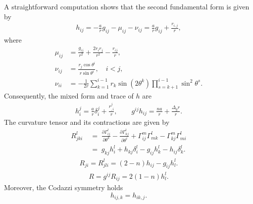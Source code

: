 \documentclass[reqno,11pt, letterpaper]{amsart}
\theoremstyle{plain}
\theoremstyle{definition}
\numberwithin{equation}{section}
\begin{document}
     A straightforward computation shows that the second fundamental form is given by
     \begin{align*}
	h_{ij}=-\frac{a}{r}g_{ij}-\mu_{ij}-\nu_{ij}=\frac{a}{r}g_{ij}+\frac{r_{i,j}}{r},
\end{align*}
     where
     \begin{align*}
     	\mu_{ij} &= \frac{g_{ij}}{r^2} + \frac{2 r_i r_j}{r^2} - \frac{r_{ij}}{r},\\
     	\nu_{ij} &= \frac{r_j \cos\theta^i}{r \sin\theta^i}, \quad i<j,\\
     	\nu_{ii} &= -\frac{1}{2r} \sum_{k=1}^{i-1} r_k \sin(2\theta^k) \prod_{s=k+1}^{i-1} \sin^2\theta^s.
     \end{align*}  
     Consequently, the mixed form and trace of $h$ are
     \begin{align}\label{kappa}
     	h_i^j = \frac{a}{r} \delta_i^j + \frac{r^j_{,i}}{r}, \qquad g^{ij} h_{ij} = \frac{n a}{r} + \frac{\Delta_g r}{r}.
     \end{align}
     The curvature tensor and its contractions are given by
          \begin{align*}
     	R^l_{jki}&\;=\;\frac{\partial\Gamma^l_{ij}}{\partial\theta^k}-\frac{\partial\Gamma^l_{kj}}{\partial\theta^i}+\Gamma^m_{ij}\Gamma^l_{mk}-\Gamma^m_{kj}\Gamma^l_{mi}\\
     	&\;=\;g_{kj}h^l_i+h_{kj}\delta^l_i-g_{ij}h^l_k-h_{ij}\delta^l_k.
     \end{align*}
     \begin{align*}
     	R_{ji}=R^{l}_{jli}=\left(2-n\right)h_{ij}-g_{ij}h^l_l.
     \end{align*}
     \begin{align*}
     	R=g^{ij}R_{ij}=2(1-n)h^l_l.
     \end{align*}
     Moreover, the Codazzi symmetry holds
     \[
     h_{ij,k} = h_{ik,j}.
     \]
    
\end{document}
